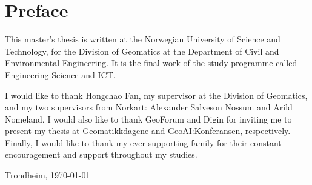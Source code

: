 \section*{Preface}

\begin{comment}
The Preface includes the facts: what type of project, where it is conducted,
who supervised, and any acknowledgements you wish to give.

This Master's Thesis template was created by Bj\"orn Gamb\"ack and is based on a template that he created for the 2016 ``Experts in Team'' course on
Computational Creativity (TDT4853) at the Norwegian University of Science and Technology (NTNU),
which in turn was heavily based on the 2014 AI Master's Thesis template created by Anders Kofod-Petersen ---
with some of the explaining text stemming from Anders' original template.

You may basically thank anybody you like (and avoid thanking anybody you do not like) and in any form you like.
However, it is a good idea to always thank people who made direct contributions, e.g., those whose data you have been given access to or those whose images you have been given permission to reproduce.

Some students choose to include the text of the original project description in the Preface. This is possible but not necessary,
in particular not if you have changed the theme somewhat over time.
The Preface of the Master's Thesis might also be a good place to introduce your Specialisation Project, in case you plan
on reusing some texts from it (since the Specialisation Project is not a published and easily accessible work, and might
not be known to your audience, neither your text in itself nor even the general concept as such).
\end{comment}

This master's thesis is written at the Norwegian University of Science and Technology, for the Division of Geomatics at the Department of Civil and Environmental Engineering. It is the final work of the study programme called Engineering Science and ICT.

I would like to thank Hongchao Fan, my supervisor at the Division of Geomatics, and my two supervisors from Norkart: Alexander Salveson Nossum and Arild Nomeland. I would also like to thank GeoForum and Digin for inviting me to present my thesis at Geomatikkdagene and GeoAI:Konferansen, respectively. Finally, I would like to thank my ever-supporting family for their constant encouragement and support throughout my studies.

\vfill

\hfill \thesisAuthor

\hfill Trondheim, \today
